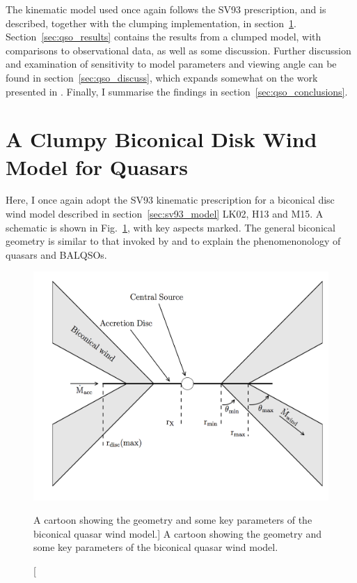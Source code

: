 The kinematic model used once again follows the SV93
prescription, and is described, together with the clumping 
implementation, in section~\ref{sec:clumpy_wind_model}.
Section~\ref{sec:qso_results} contains the results from a clumped model, 
with comparisons to observational data, as well as some discussion. 
Further discussion and examination of sensitivity to model parameters
and viewing angle can be found in section~\ref{sec:qso_discuss}, which
expands somewhat on the work presented in \citep{M16}.
Finally, I summarise the findings in section~\ref{sec:qso_conclusions}.

%
%

\section{A Clumpy Biconical Disk Wind Model for Quasars}
\label{sec:clumpy_wind_model}
Here, I once again adopt the SV93 kinematic prescription for a 
biconical disc wind model described in section~\ref{sec:sv93_model}
LK02, H13 and M15. A schematic is shown in Fig.~\ref{fig:cartoon},
with key aspects marked. The general biconical
geometry is similar to that invoked by \cite{MCGV95} and 
\cite{elvis2000} to explain the phenomenonology
of quasars and BALQSOs.

\begin{figure} 
\centering
\includegraphics[width=1.0\textwidth]{figures/06-agnpaper/fig1.png}
\caption
[A cartoon showing the geometry and some key parameters of
the biconical quasar wind model.]
{
A cartoon showing the geometry and some key parameters of
the biconical quasar wind model.
}
\label{fig:cartoon}
\end{figure} 

